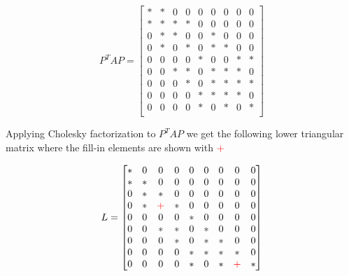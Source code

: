 $$
P^{T}AP = 
\begin{bmatrix}
* & * & 0 & 0 & 0 & 0 & 0 & 0 & 0 \\
* & * & * & * & 0 & 0 & 0 & 0 & 0 \\
0 & * & * & 0 & 0 & * & 0 & 0 & 0 \\
0 & * & 0 & * & 0 & * & * & 0 & 0 \\
0 & 0 & 0 & 0 & * & 0 & 0 & * & * \\
0 & 0 & * & * & 0 & * & * & * & 0 \\
0 & 0 & 0 & * & 0 & * & * & * & * \\
0 & 0 & 0 & 0 & * & * & * & * & 0 \\
0 & 0 & 0 & 0 & * & 0 & * & 0 & * \\
\end{bmatrix}
$$

\noindent
Applying Cholesky factorization to $P^{T}AP$ we get the following lower triangular matrix where the fill-in elements are shown with $\color{red}{+}$

$$
L = 
\begin{bmatrix}
* & 0 & 0 & 0 & 0 & 0 & 0 & 0 & 0 \\
* & * & 0 & 0 & 0 & 0 & 0 & 0 & 0 \\
0 & * & * & 0 & 0 & 0 & 0 & 0 & 0 \\
0 & * & \color{red}{+} & * & 0 & 0 & 0 & 0 & 0 \\
0 & 0 & 0 & 0 & * & 0 & 0 & 0 & 0 \\
0 & 0 & * & * & 0 & * & 0 & 0 & 0 \\
0 & 0 & 0 & * & 0 & * & * & 0 & 0 \\
0 & 0 & 0 & 0 & * & * & * & * & 0 \\
0 & 0 & 0 & 0 & * & 0 & * & \color{red}{+} & * \\
\end{bmatrix}
$$
